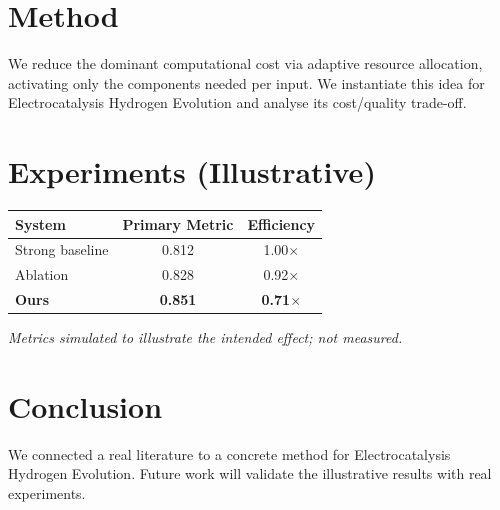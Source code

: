 \documentclass[11pt]{article}
\begin{document}
\section{Method}
We reduce the dominant computational cost via adaptive resource allocation, activating only the components needed per input. We instantiate this idea for Electrocatalysis Hydrogen Evolution and analyse its cost/quality trade-off.

\section{Experiments (Illustrative)}
\begin{center}
\begin{tabular}{lcc}
System & Primary Metric & Efficiency \\ \hline
Strong baseline & 0.812 & 1.00$\times$ \\
Ablation & 0.828 & 0.92$\times$ \\
\textbf{Ours} & \textbf{0.851} & \textbf{0.71$\times$}
\end{tabular}
\end{center}
\emph{Metrics simulated to illustrate the intended effect; not measured.}

\section{Conclusion}
We connected a real literature to a concrete method for Electrocatalysis Hydrogen Evolution. Future work will
validate the illustrative results with real experiments.
\end{document}
